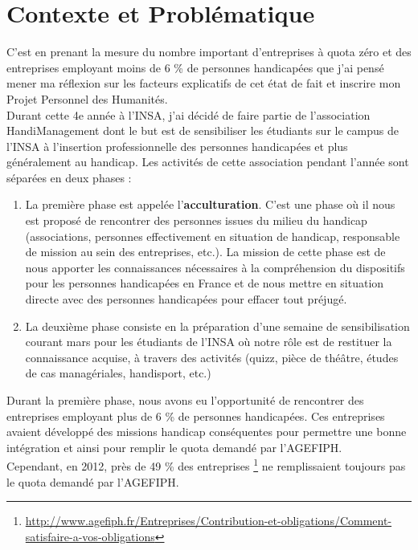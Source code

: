 \section{Contexte et Problématique}
C'est en prenant la mesure du nombre important d'entreprises à quota zéro et  des entreprises employant moins de 6 \% de personnes handicapées que j'ai pensé mener ma réflexion sur les facteurs explicatifs de cet état de fait et inscrire mon Projet Personnel des Humanités. \\

Durant cette 4e année à l'INSA, j'ai décidé de faire partie de l'association HandiManagement dont le but est de sensibiliser les étudiants sur le campus de l'INSA à l'insertion professionnelle des personnes handicapées et plus généralement au handicap. Les activités de cette association pendant l'année sont séparées en deux phases :
\begin{enumerate}
\item La première phase est appelée l'\textbf{acculturation}. C'est une phase où il nous est proposé de rencontrer des personnes issues du milieu du handicap (associations, personnes effectivement en situation de handicap, responsable de mission au sein des entreprises, etc.). La mission de cette phase est de nous apporter les connaissances nécessaires à la compréhension du dispositifs pour les personnes handicapées en France et de nous mettre en situation directe avec des personnes handicapées pour effacer tout préjugé.
\item La deuxième phase consiste en la préparation d'une semaine de sensibilisation courant mars pour les étudiants de l'INSA où notre r\^ole est de restituer la connaissance acquise, à travers des activités (quizz, pièce de thé\^atre, études de cas managériales, handisport, etc.)\\
\end{enumerate}

Durant la première phase, nous avons eu l'opportunité de rencontrer des entreprises employant plus de 6 \% de personnes handicapées. Ces entreprises avaient développé des missions handicap conséquentes pour permettre une bonne intégration et ainsi pour remplir le quota demandé par l'AGEFIPH.\\

Cependant, en 2012, près de 49 \% des entreprises \footnote{\url{http://www.agefiph.fr/Entreprises/Contribution-et-obligations/Comment-satisfaire-a-vos-obligations}} ne remplissaient toujours pas le quota demandé par l'AGEFIPH.\\


